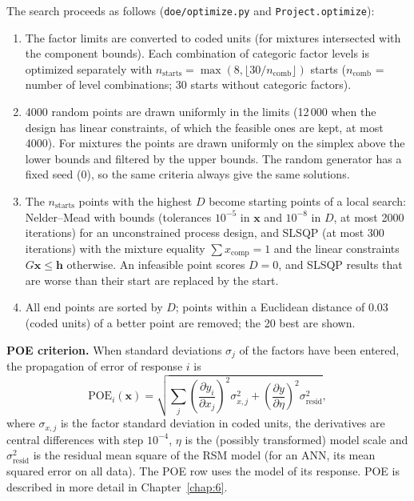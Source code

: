 The search proceeds as follows (\texttt{doe/optimize.py} and \texttt{Project.optimize}):
\begin{enumerate}
  \item The factor limits are converted to coded units (for mixtures intersected with the component bounds).
        Each combination of categoric factor levels is optimized separately with
        $n_\text{starts}=\max(8,\lfloor 30/n_\text{comb}\rfloor)$ starts ($n_\text{comb}$ = number of level
        combinations; 30 starts without categoric factors).
  \item 4000 random points are drawn uniformly in the limits (12\,000 when the design has linear constraints, of
        which the feasible ones are kept, at most 4000). For mixtures the points are drawn uniformly on the simplex
        above the lower bounds and filtered by the upper bounds. The random generator has a fixed seed (0), so the
        same criteria always give the same solutions.
  \item The $n_\text{starts}$ points with the highest $D$ become starting points of a local search: Nelder--Mead
        with bounds (tolerances $10^{-5}$ in $\mathbf x$ and $10^{-8}$ in $D$, at most 2000 iterations) for an
        unconstrained process design, and SLSQP (at most 300 iterations) with the mixture equality
        $\sum x_\text{comp}=1$ and the linear constraints $G\mathbf x\le\mathbf h$ otherwise. An infeasible point
        scores $D=0$, and SLSQP results that are worse than their start are replaced by the start.
  \item All end points are sorted by $D$; points within a Euclidean distance of 0.03 (coded units) of a better
        point are removed; the 20 best are shown.
\end{enumerate}

\textbf{POE criterion.} When standard deviations $\sigma_j$ of the factors have been entered, the propagation of
error of response $i$ is
\begin{equation}
\text{POE}_i(\mathbf x)=\sqrt{\sum_j\left(\frac{\partial y_i}{\partial x_j}\right)^2\sigma_{x,j}^2
+\left(\frac{\partial y}{\partial\eta}\right)^2\sigma^2_\text{resid}},
\label{eq:ch08-poe}
\end{equation}
where $\sigma_{x,j}$ is the factor standard deviation in coded units, the derivatives are central differences with
step $10^{-4}$, $\eta$ is the (possibly transformed) model scale and $\sigma^2_\text{resid}$ is the residual mean
square of the RSM model (for an ANN, its mean squared error on all data). The POE row uses the model of its response.
POE is described in more detail in Chapter~\ref{chap:6}.

